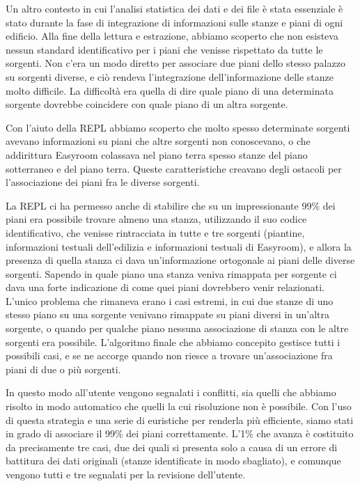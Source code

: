 \documentclass[12pt]{report}
\begin{document}
Un altro contesto in cui l'analisi statistica dei dati e dei file è
stata essenziale è stato durante la fase di integrazione di informazioni sulle
stanze e piani di ogni edificio. Alla fine della lettura e estrazione, abbiamo
scoperto che non esisteva nessun standard identificativo per i piani che
venisse rispettato da tutte le sorgenti. Non c'era un modo diretto per
associare due piani dello stesso palazzo su sorgenti diverse, e ciò rendeva
l'integrazione dell'informazione delle stanze molto difficile. La difficoltà
era quella di dire quale piano di una determinata sorgente dovrebbe coincidere
con quale piano di un altra sorgente. 

Con l'aiuto della REPL abbiamo scoperto che molto spesso determinate
sorgenti avevano informazioni su piani che altre sorgenti non
conoscevano, o che addirittura Easyroom colassava nel piano terra
spesso stanze del piano sotterraneo e del piano terra. Queste
caratteristiche creavano degli ostacoli per l'associazione dei piani
fra le diverse sorgenti.

La REPL ci ha permesso anche di stabilire che su un impressionante
99\% dei piani era possibile trovare almeno una stanza, utilizzando il
suo codice identificativo, che venisse rintracciata in tutte e tre
sorgenti (piantine, informazioni testuali dell'edilizia e informazioni
testuali di Easyroom), e allora la presenza di quella stanza ci dava
un'informazione ortogonale ai piani delle diverse sorgenti. Sapendo in
quale piano una stanza veniva rimappata per sorgente ci dava una forte
indicazione di come quei piani dovrebbero venir relazionati. L'unico problema
che rimaneva erano i casi estremi, in cui due stanze di uno stesso piano su
una sorgente venivano rimappate su piani diversi in un'altra sorgente, o
quando per qualche piano nessuna associazione di stanza con le altre sorgenti
era possibile. L'algoritmo finale che abbiamo concepito gestisce tutti i
possibili casi, e se ne accorge quando non riesce a trovare un'associazione
fra piani di due o più sorgenti. 

In questo modo all'utente vengono segnalati i conflitti, sia quelli
che abbiamo risolto in modo automatico che quelli la cui risoluzione
non è possibile. Con l'uso di questa strategia e una serie di
euristiche per renderla più efficiente, siamo stati in grado di
associare il 99\% dei piani correttamente. L'1\% che avanza è
costituito da precisamente tre casi, due dei quali si presenta solo a
causa di un errore di battitura dei dati originali (stanze identificate in
modo sbagliato), e comunque vengono tutti e tre segnalati per la
revisione dell'utente. 
\end{document}
